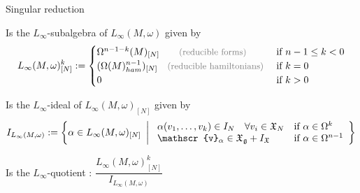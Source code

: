 \documentclass[handout,10pt]{beamer}
\providecommand{\vHam}{\mathscr{v}}
\begin{document}
\begin{frame}{Singular reduction}
	\begin{defpropblock}
		Is the {\color{blue!70!black}$L_\infty$-subalgebra} of $L_\infty(M,\omega)$ given by
		\begin{displaymath}
			L_\infty(M,\omega)_{[N]}^k :=
			\begin{cases}
				\Omega^{n-1-k}(M)_{[N]} 
				\qquad\text{\color{gray}\small (reducible forms) }
				& \text{if } n-1\leq k < 0 \\
				(\Omega(M)_{ham}^{n-1})_{[N]} 
				\quad
				\text{\color{gray}\small (reducible hamiltonians) }
				& \text{if } k = 0 \\
				0 & \text{if } k > 0
			\end{cases}
		\end{displaymath}
	\end{defpropblock}
	\pause
	\begin{defpropblock}
		Is the {\color{blue!70!black}$L_\infty$-ideal} of $L_\infty(M,\omega)_{[N]}$ given by
		\begin{displaymath}
			I_{L_\infty(M,\omega)} :=
			\left\lbrace
				\alpha \in L_\infty(M,\omega)_{[N]}
			~\left\vert~
				\begin{array}{l l}
					\alpha(v_1,\dots,v_k) \in I_N  \quad \forall v_i \in \X_N &
					\text{if}~ \alpha \in \Omega^k \\
					\vHam_\alpha \in \X_\g + I_\X &
					\text{if}~ \alpha \in \Omega^{n-1}
				\end{array}
			\right\rbrace\right.
		\end{displaymath}
	\end{defpropblock}
	\pause
	\begin{defblock}
		Is the $L_\infty$-quotient : \quad
		$\dfrac{L_\infty(M,\omega)_{[N]}^k}{I_{L_\infty(M,\omega)}}$
	\end{defblock}

\end{frame}
\end{document}

